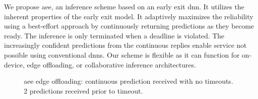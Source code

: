 We propose \acrfull{aee}, an inference scheme based on an early exit \gls{dnn}. It utilizes the inherent properties of the early exit model. It adaptively maximizes the reliability using a best-effort approach by continuously returning predictions as they become ready. The inference is only terminated when a deadline is violated. The increasingly confident predictions from the continuous replies enable service not possible using conventional \gls{dnn}s. Our scheme is flexible as it can function for on-device, edge offloading, or collaborative inference architectures. 
\begin{figure}
	\captionsetup[subfigure]{justification=centering}
	\centering
\end{figure}
\begin{figure}
	\captionsetup[subfigure]{justification=centering}
	\centering
	\caption[Offloading scheme]{\gls{aee} edge offloading: \protect{} continuous prediction received with no timeouts. \protect{} 2 predictions received prior to timeout. }
	\label{fig:offloading-scheme}
\end{figure} 

